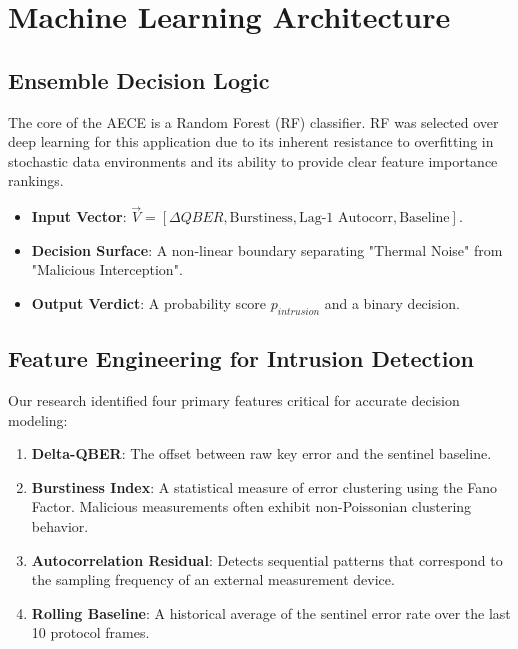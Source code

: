\documentclass[journal,onecolumn,12pt,draftclsnofoot]{IEEEtran}
\begin{document}
\newpage

\section{Machine Learning Architecture}

\subsection{Ensemble Decision Logic}
The core of the AECE is a Random Forest (RF) classifier. RF was selected over deep learning for this application due to its inherent resistance to overfitting in stochastic data environments and its ability to provide clear feature importance rankings.
\begin{itemize}
    \item \textbf{Input Vector}: $\vec{V} = [ \Delta QBER, \text{Burstiness}, \text{Lag-1 Autocorr}, \text{Baseline} ]$.
    \item \textbf{Decision Surface}: A non-linear boundary separating "Thermal Noise" from "Malicious Interception".
    \item \textbf{Output Verdict}: A probability score $p_{intrusion}$ and a binary decision.
\end{itemize}

\subsection{Feature Engineering for Intrusion Detection}
Our research identified four primary features critical for accurate decision modeling:
\begin{enumerate}
    \item \textbf{Delta-QBER}: The offset between raw key error and the sentinel baseline.
    \item \textbf{Burstiness Index}: A statistical measure of error clustering using the Fano Factor. Malicious measurements often exhibit non-Poissonian clustering behavior.
    \item \textbf{Autocorrelation Residual}: Detects sequential patterns that correspond to the sampling frequency of an external measurement device.
    \item \textbf{Rolling Baseline}: A historical average of the sentinel error rate over the last 10 protocol frames.
\end{enumerate}
\end{document}
